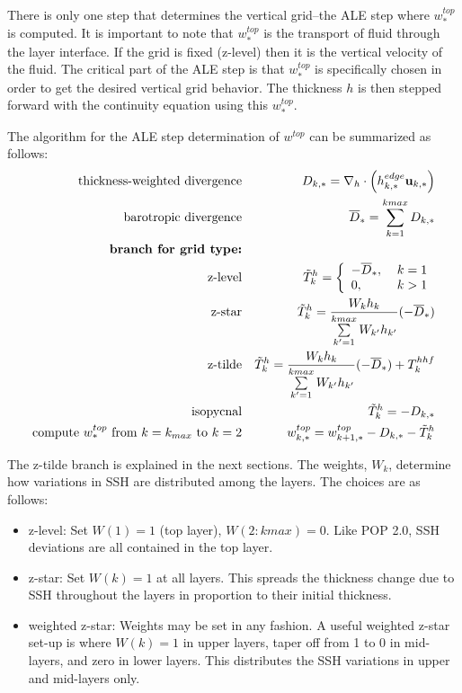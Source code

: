 \documentclass[11pt]{report}
\newcommand{\bea}{\begin{eqnarray}}
\newcommand{\eea}{\end{eqnarray}}
\begin{document}
There is only one step that determines the vertical grid--the ALE step where $w^{top}_*$ is computed.  It is important to note that $w^{top}_*$ is the transport of fluid through the layer interface.  If the grid is fixed (z-level) then it is the vertical velocity of the fluid.  The critical part of the ALE step is that $w^{top}_*$ is specifically chosen in order to get the desired vertical grid behavior.  The thickness $h$ is then stepped forward with the continuity equation using this $w^{top}_*$.

The algorithm for the ALE step determination of $w^{top}$ can be summarized as follows:
\bea
\mbox{thickness-weighted divergence} && D_{k,*} = \nabla_h \cdot  \left( h^{edge}_{k,*} {\bf u}_{k,*} \right)  \label{D1a} \\
\mbox{barotropic divergence} && {\overline D}_* = \sum\limits_{k=1}^{kmax} D_{k,*}  \\
\mbox{\bf branch for grid type:} &&  \\
\mbox{z-level} && {\tilde T}^h_k = \left\{ 
\begin{array}{ll}-{\overline D}_*, &\; k=1 \\0, &\; k>1 \end{array}\right.\\
\mbox{z-star} && {\tilde T}^h_k = \frac{W_k h_k}{\sum\limits_{k'=1}^{kmax} W_{k'} h_{k'}}(-{\overline D}_*)\\
\mbox{z-tilde} && {\tilde T}^h_k = \frac{W_k h_k}{\sum\limits_{k'=1}^{kmax} W_{k'} h_{k'}}(-{\overline D}_*) + T^{hhf}_k\\
\mbox{isopycnal} && {\tilde T}^h_k = - D_{k,*}\\
\mbox{compute $w^{top}_*$ from $k=k_{max}$ to $k=2$} && w^{top}_{k,*} = w^{top}_{k+1,*} - D_{k,*} - {\tilde T}^h_k 
\eea

The z-tilde branch is explained in the next sections.  The weights, $W_k$, determine how variations in SSH are distributed among the layers.  The choices are as follows:
\begin{itemize}
\item z-level: Set $W(1)=1$ (top layer), $W(2:kmax)=0$.  Like POP 2.0, SSH deviations are all contained in the top layer.  
\item z-star: Set $W(k)=1$ at all layers.  This spreads the thickness change due to SSH throughout the layers in proportion to their initial thickness.
\item weighted z-star: Weights may be set in any fashion.  A useful weighted z-star set-up is where $W(k)=1$ in upper layers, taper off from 1 to 0 in mid-layers, and zero in lower layers.  This distributes the SSH variations in upper and mid-layers only.
\end{itemize}
\end{document}
